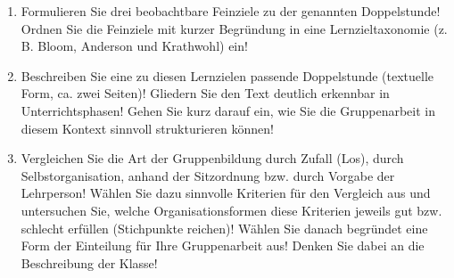 \documentclass{bschlangaul-aufgabe}
\begin{document}
\begin{enumerate}


\item Formulieren Sie drei beobachtbare Feinziele zu der genannten
Doppelstunde! Ordnen Sie die Feinziele mit kurzer Begründung in eine
Lernzieltaxonomie (z. B. Bloom, Anderson und Krathwohl) ein!


\item Beschreiben Sie eine zu diesen Lernzielen passende Doppelstunde
(textuelle Form, ca. zwei Seiten)! Gliedern Sie den Text deutlich
erkennbar in Unterrichtsphasen! Gehen Sie kurz darauf ein, wie Sie die
Gruppenarbeit in diesem Kontext sinnvoll strukturieren können!


\item Vergleichen Sie die Art der Gruppenbildung durch Zufall (Los),
durch Selbstorganisation, anhand der Sitzordnung bzw. durch Vorgabe der
Lehrperson! Wählen Sie dazu sinnvolle Kriterien für den Vergleich aus
und untersuchen Sie, welche Organisationsformen diese Kriterien jeweils
gut bzw. schlecht erfüllen (Stichpunkte reichen)! Wählen Sie danach
begründet eine Form der Einteilung für Ihre Gruppenarbeit aus! Denken
Sie dabei an die Beschreibung der Klasse!
\end{enumerate}
\end{document}
